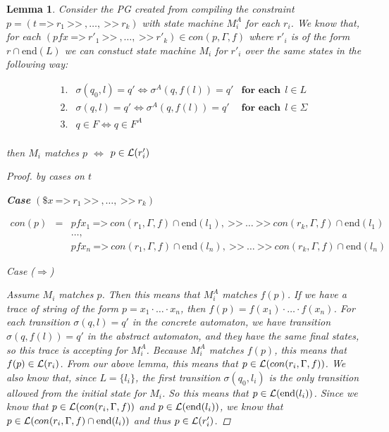 \documentclass[twocolumn, openany]{sig-alternate-10pt}
\newcommand{\Prefer}{\texttt{>>}}
\newcommand{\Path}{\texttt{=>}}
\newtheorem{lem}[thm]{Lemma}
\begin{document}
\begin{lem}
  Consider the PG created from compiling the constraint $p = (t ~\Path~ r_1 ~\Prefer~,\dots, ~\Prefer~ r_k)$ with state machine $M^A_i$ for each $r_i$. We know that, for each $(pfx ~\Path~ r'_1 ~\Prefer~,\dots, ~\Prefer~ r'_k) \in con(p,\Gamma,f)$ where $r'_i$ is of the form $r \cap \text{end}(L)$ we can constuct state machine $M_i$ for $r'_i$ over the same states in the following way:
    
    \[ \begin{array}{lll}
      1. & \sigma(q_0,l) = q' \iff \sigma^A(q,f(l)) = q' & \textbf{for each}~~ l \in L \\
      2. & \sigma(q,l) = q' \iff \sigma^A(q,f(l)) = q' & \textbf{for each}~~ l \in \Sigma \\
      3. & q \in F \iff q \in F^A & \\
    \end{array} \]

  then $M_i$ matches $p$ $\iff$ $p \in \mathcal{L}(r_i')$
  
  \vspace{1em}
  \begin{proof} by cases on $t$

    \vspace{1em}

    \textbf{Case} $(\$x ~\Path~ r_1 ~\Prefer~,\dots, ~\Prefer~ r_k)$

    \[ \begin{array}{lcl}
      con(p) &=& pfx_1 ~\Path~ con(r_1,\Gamma,f) \cap \text{end}(l_1), ~\Prefer~ \dots ~\Prefer~ con(r_k,\Gamma,f) \cap \text{end}(l_1)  \\
             & & \dots, \\
             & & pfx_n ~\Path~ con(r_1,\Gamma,f) \cap \text{end}(l_n), ~\Prefer~ \dots ~\Prefer~ con(r_k,\Gamma,f) \cap \text{end}(l_n)
    \end{array} \]

    Case ($\Rightarrow$)

    Assume $M_i$ matches $p$. Then this means that $M^A_i$ matches $f(p)$. If we have a trace of string of the form $ p = x_1 \cdot \dots \cdot x_n$, then $f(p) = f(x_1) \cdot \dots \cdot f(x_n)$. For each transition $\sigma(q,l) = q'$ in the concrete automaton, we have transition $\sigma(q,f(l)) = q'$ in the abstract automaton, and they have the same final states, so this trace is accepting for $M^A_i$. Because $M^A_i$ matches $f(p)$, this means that $f(p) \in \mathcal{L}(r_i)$. From our above lemma, this means that $p \in \mathcal{L}(con(r_i,\Gamma,f))$. We also know that, since $L = \{ l_i \}$, the first transition $\sigma(q_0,l_i)$ is the only transition allowed from the initial state for $M_i$. So this means that $p \in \mathcal{L}(\text{end}(l_i))$. Since we know that $p \in \mathcal{L}(con(r_i,\Gamma,f))$ and $p \in \mathcal{L}(\text{end}(l_i))$, we know that $p \in \mathcal{L}(con(r_i,\Gamma,f) \cap \text{end}(l_i))$ and thus $p \in \mathcal{L}(r'_i)$.


\end{proof}
\end{lem}
\end{document}
